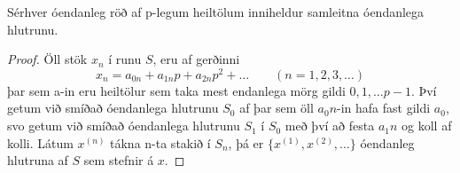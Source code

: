 \begin{hjalparsetn}
Sérhver óendanleg röð af p-legum heiltölum inniheldur samleitna óendanlega hlutrunu. 
\end{hjalparsetn}
\begin{proof}
Öll stök $x_n$ í runu $S$, eru af gerðinni
\begin{equation*}
x_n = a_{0n} + a_{1n}p+a_{2n}p^2 + \ldots \qquad (n= 1,2,3,\ldots)
\end{equation*}
þar sem a-in eru heiltölur sem taka mest endanlega mörg gildi $0,1, \ldots p-1$.
Því getum við smíðað óendanlega hlutrunu $S_0$ af þar sem öll $a_0n$-in hafa fast gildi $a_0$, svo getum við 
smíðað óendanlega hlutrunu $S_1$ í $S_0$ með því að festa $a_1n$ og koll af kolli.
Látum $x^{(n)}$ tákna n-ta stakið í $S_n$, þá er $\{x^{(1)},x^{(2)},\ldots \}$ óendanleg hlutruna af $S$ sem stefnir á $x$. 
\end{proof}


